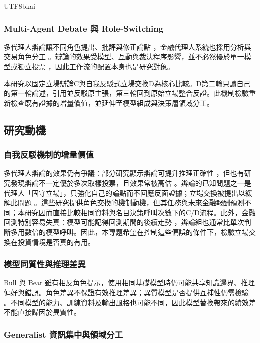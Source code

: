 \documentclass[12pt,a4paper]{article}
\begin{document}
\begin{CJK}{UTF8}{bkai}
\subsubsection{Multi-Agent Debate 與 Role-Switching}
多代理人辯論讓不同角色提出、批評與修正論點 \citep{du2023debate,liang2023divergent}，金融代理人系統也採用分析與交易角色分工 \citep{xiao2024tradingagents,zhang2024stockagent}。辯論的效果受模型、互動與裁決程序影響，並不必然優於單一模型或獨立投票 \citep{smit2023mad,zhang2025stop}，因此工作流的配置本身也是研究對象。

本研究以固定立場辯論C與自我反駁式立場交換D為核心比較。D第二輪只讀自己的第一輪論述，引用並反駁原主張，第三輪回到原始立場整合反證。此機制檢驗重新檢查既有證據的增量價值，並延伸至模型組成與決策層領域分工。

\subsection{研究動機}

\subsubsection{自我反駁機制的增量價值}
多代理人辯論的效果仍有爭議：部分研究顯示辯論可提升推理正確性 \citep{du2023debate}，但也有研究發現辯論不一定優於多次取樣投票，且效果常被高估 \citep{smit2023mad,zhang2025stop}。辯論的已知問題之一是代理人「固守立場」，只強化自己的論點而不回應反面證據；立場交換被提出以緩解此問題 \citep{liu2025roleswitch,chowdhury2026proclaim}。這些研究提供角色交換的機制動機，但其任務與未來金融報酬預測不同；本研究因而直接比較相同資料與名目決策呼叫次數下的C/D流程。此外，金融回測特別容易失真：模型可能記得回測期間的後續走勢 \citep{glasserman2023lookahead,kong2026bias}，辯論組也通常比單次判斷多用數倍的模型呼叫。因此，本專題希望在控制這些偏誤的條件下，檢驗立場交換在投資情境是否真的有用。
\subsubsection{模型同質性與推理差異}

Bull 與 Bear 雖有相反角色提示，使用相同基礎模型時仍可能共享知識邊界、推理偏好與錯誤。角色差異不保證有效推理差異；異質模型是否提供互補性仍需檢驗 \citep{zhang2025stop}。不同模型的能力、訓練資料及輸出風格也可能不同，因此模型替換帶來的績效差不能直接歸因於異質性。

\subsubsection{Generalist 資訊集中與領域分工}


\end{CJK}
\end{document}
